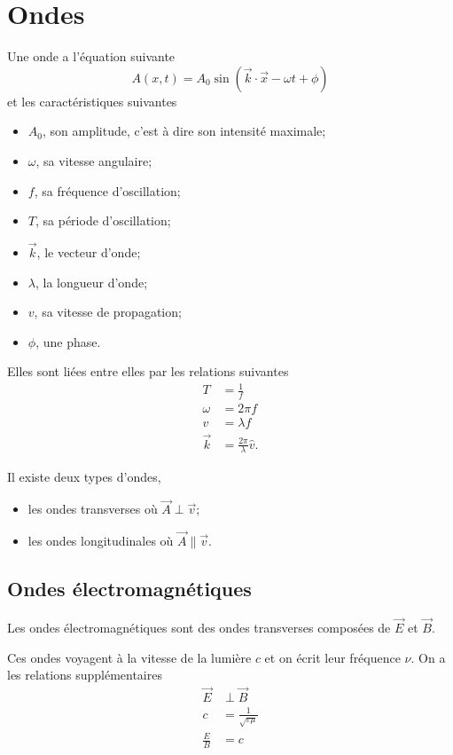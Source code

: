\section{Ondes}
Une onde a l'équation suivante
\[ A(x, t) = A_0 \sin(\vec{k} \cdot \vec{x} - \omega t + \phi) \]
et les caractéristiques suivantes
\begin{itemize}
  \item $A_0$, son amplitude, c'est à dire son intensité maximale;
  \item $\omega$, sa vitesse angulaire;
  \item $f$, sa fréquence d'oscillation;
  \item $T$, sa période d'oscillation;
  \item $\vec{k}$, le vecteur d'onde;
  \item $\lambda$, la longueur d'onde;
  \item $v$, sa vitesse de propagation;
  \item $\phi$, une phase.
\end{itemize}
Elles sont liées entre elles par les relations suivantes
\begin{align*}
  T & = \frac{1}{f}\\
  \omega & = 2\pi f\\
  v & = \lambda f\\
  \vec{k} & = \frac{2\pi}{\lambda}\hat{v}.
\end{align*}

Il existe deux types d'ondes,
\begin{itemize}
  \item les ondes transverses où $\vec{A} \perp \vec{v}$;
  \item les ondes longitudinales où $\vec{A} \parallel \vec{v}$.
\end{itemize}

\subsection{Ondes électromagnétiques}
Les ondes électromagnétiques sont des ondes transverses composées
de $\vec{E}$ et $\vec{B}$.

Ces ondes voyagent à la vitesse de la lumière $c$
et on écrit leur fréquence $\nu$.
On a les relations supplémentaires
\begin{align*}
  \vec{E} & \perp \vec{B}\\
  c & = \frac{1}{\sqrt{\varepsilon\mu}}\\
  \frac{E}{B} & = c
\end{align*}

